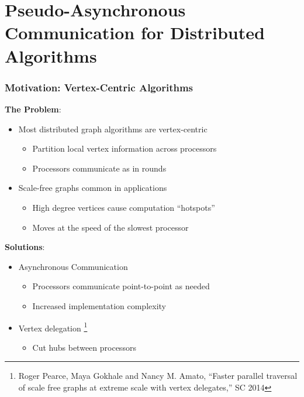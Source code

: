 \documentclass{beamer}
\begin{document}








\section{Pseudo-Asynchronous Communication for Distributed Algorithms}


\begin{frame}
\frametitle{Motivation: Vertex-Centric Algorithms}

\textbf{The Problem}:
\begin{itemize}
	\item Most distributed graph algorithms are vertex-centric
	\begin{itemize}
		\item Partition local vertex information across processors
		\item Processors communicate as in rounds \cite{malewicz2010pregel}
	\end{itemize}
	\item Scale-free graphs common in applications
	\begin{itemize}
		\item High degree vertices cause computation ``hotspots''
		\item Moves at the speed of the slowest processor
	\end{itemize}
\end{itemize}

\textbf{Solutions}:
\begin{itemize}
	\item Asynchronous Communication 
	\begin{itemize}
		\item Processors communicate point-to-point as needed
		\item Increased implementation complexity
	\end{itemize}
	\item Vertex delegation \cite{pearce2014faster}
	\footnote{\scriptsize Roger Pearce, Maya Gokhale and Nancy M. Amato, ``Faster parallel traversal of scale free graphs at extreme scale with vertex delegates,'' SC 2014}
	\begin{itemize}
		\item Cut hubs between processors
	\end{itemize}
\end{itemize}


\end{frame}
\end{document}
